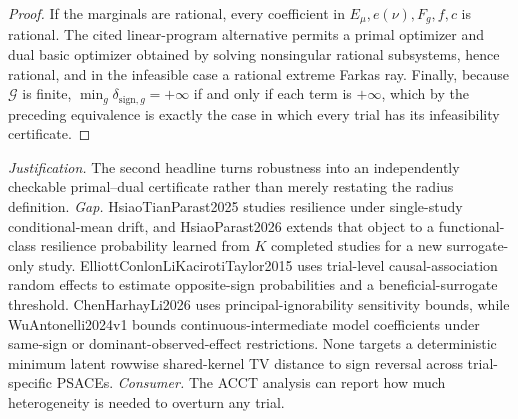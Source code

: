 \documentclass{article}
\begin{document}
\begin{proof}
If the marginals are rational, every coefficient in \(E_\mu,e(\nu),F_g,f,c\) is rational.  The cited linear-program alternative permits a primal optimizer and dual basic optimizer obtained by solving nonsingular rational subsystems, hence rational, and in the infeasible case a rational extreme Farkas ray.  Finally, because \(\mathcal G\) is finite,
\(\min_g\delta_{\mathrm{sign},g}=+\infty\) if and only if each term is \(+\infty\), which by the preceding equivalence is exactly the case in which every trial has its infeasibility certificate.
\end{proof}
\par\smallskip\noindent \textit{Justification.} The second headline turns robustness into an independently checkable primal--dual certificate rather than merely restating the radius definition. \textit{Gap.} HsiaoTianParast2025 studies resilience under single-study conditional-mean drift, and HsiaoParast2026 extends that object to a functional-class resilience probability learned from \(K\) completed studies for a new surrogate-only study. ElliottConlonLiKacirotiTaylor2015 uses trial-level causal-association random effects to estimate opposite-sign probabilities and a beneficial-surrogate threshold. ChenHarhayLi2026 uses principal-ignorability sensitivity bounds, while WuAntonelli2024v1 bounds continuous-intermediate model coefficients under same-sign or dominant-observed-effect restrictions. None targets a deterministic minimum latent rowwise shared-kernel TV distance to sign reversal across trial-specific PSACEs. \textit{Consumer.} The ACCT analysis can report how much heterogeneity is needed to overturn any trial.
\end{document}
